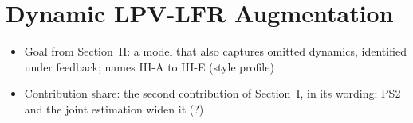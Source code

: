 \section{Dynamic LPV-LFR Augmentation}\label{sec:augmentation}
\ifdraft
\begin{itemize}
\item Goal from Section~II: a model that also captures omitted dynamics, identified under feedback; names III-A to III-E (style profile)
\item Contribution share: the second contribution of Section~I, in its wording; PS2 and the joint estimation widen it (?)
\end{itemize}
\fi

